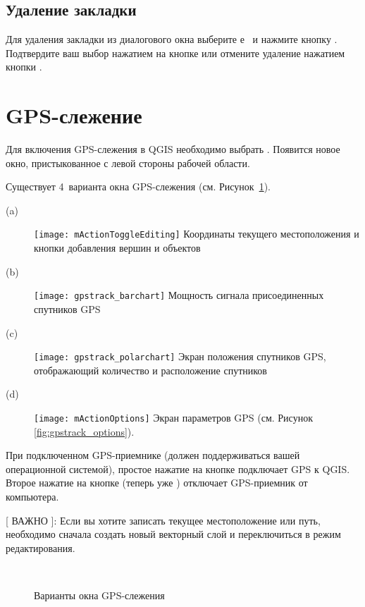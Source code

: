\subsection{Удаление закладки}
Для удаления закладки из диалогового окна 
выберите е~ и нажмите кнопку . Подтвердите ваш выбор
нажатием на кнопке  или отмените удаление нажатием кнопки
.

\section{GPS-слежение}\label{sec:gpstracking}

Для включения GPS-слежения в QGIS необходимо выбрать 
\arrow {}. Появится новое окно, пристыкованное
с левой стороны рабочей области.

Существует 4~варианта окна GPS-слежения (см. Рисунок~\ref{fig:gpstrack_live}).

\begin{description}
 \item[(a)] \texttt{[image: mActionToggleEditing]}
 Координаты текущего местоположения и кнопки добавления вершин и объектов
 \item[(b)] \texttt{[image: gpstrack\_barchart]}
 Мощность сигнала присоединенных спутников GPS
 \item[(c)] \texttt{[image: gpstrack\_polarchart]}
 Экран положения спутников GPS, отображающий количество и расположение спутников
 \item[(d)] \texttt{[image: mActionOptions]}
 Экран параметров GPS (см. Рисунок \ref{fig:gpstrack_options}).
\end{description}

При подключенном GPS-приемнике (должен поддерживаться вашей операционной
системой), простое нажатие на кнопке  подключает
GPS к QGIS. Второе нажатие на кнопке (теперь уже )
отключает GPS-приемник от компьютера.

[ ВАЖНО ]: Если вы хотите записать текущее местоположение или путь,
необходимо сначала создать новый векторный слой и переключиться в режим
редактирования.

\begin{figure}[ht]
\centering
     \hspace{0.33cm}
     \hspace{0.33cm}
    \\
\caption{Варианты окна GPS-слежения \nixcaption} \label{fig:gpstrack_live}
\end{figure}

